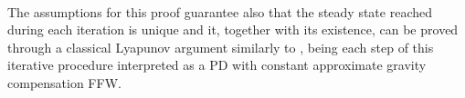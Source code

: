 ~
\\
The assumptions for this proof guarantee also that the steady state reached during each iteration is unique \cite{deluca93} and it, together with its existence, can be proved through a classical Lyapunov argument similarly to \cite{simplepd, pdstable}, being each step of this iterative procedure interpreted as a PD with constant approximate gravity compensation FFW.


